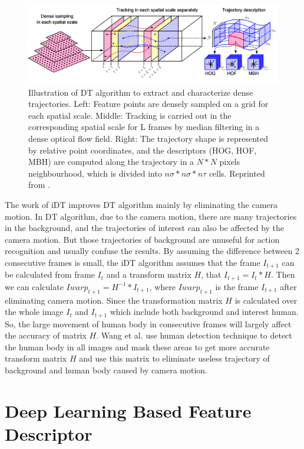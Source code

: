 \begin{figure}
	\includegraphics[width=\linewidth]{figs/DT.png}
	\caption{Illustration of DT algorithm to extract and characterize dense trajectories. Left: Feature points
		are densely sampled on a grid for each spatial scale. Middle: Tracking is carried out in the corresponding
		spatial scale for L frames by median filtering in a dense optical flow field. Right: The trajectory shape
		is represented by relative point coordinates, and the descriptors (HOG, HOF, MBH) are computed along
		the trajectory in a \(N * N\) pixels neighbourhood, which is divided into \(n\sigma * n\sigma * n\tau \) cells. Reprinted from \cite{wang2012}.}
	\label{fig:DT}
\end{figure}
 
\par 
The work of iDT \cite{wang2013} improves DT algorithm mainly by eliminating the camera motion. In DT algorithm, due to the camera motion, there are many trajectories in the background, and the trajectories of interest can also be affected by the camera motion. But those trajectories of background are unuseful for action recognition and usually confuse the results. By assuming the difference between 2 consecutive frames is small, the iDT algorithm assumes that the frame \(I_{t+1}\) can be calculated from frame \(I_t\) and a transform matrix \(H\), that \(I_{t+1} = I_t * H \).  Then we can calculate \(Iwarp_{t+1} = H^{-1} * I_{t+1}\), where \(Iwarp_{t+1}\) is the frame \(I_{t+1}\) after eliminating camera motion. Since the transformation matrix \(H\) is calculated over the whole image \(I_t\) and \(I_{t+1}\) which include both background and interest human. So, the large movement of human body in consecutive frames will largely affect the accuracy of matrix \(H \). Wang et al. use human detection technique to detect the human body in all images and mask these areas to get more accurate transform matrix \(H\) and use this matrix to eliminate useless trajectory of background and human body caused by camera motion.

\section{Deep Learning Based Feature Descriptor}
\label{2_3}

